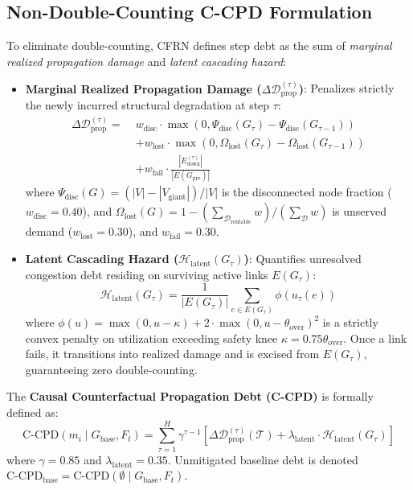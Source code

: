 \documentclass[pdflatex,sn-mathphys-num]{sn-jnl}
\theoremstyle{thmstyleone}
\theoremstyle{thmstyletwo}
\theoremstyle{thmstylethree}
\begin{document}
\subsection{Non-Double-Counting C-CPD Formulation}
To eliminate double-counting, CFRN defines step debt as the sum of \textit{marginal realized propagation damage} and \textit{latent cascading hazard}:
\begin{itemize}
    \item \textbf{Marginal Realized Propagation Damage ($\Delta \mathcal{D}_{\mathrm{prop}}^{(\tau)}$)}: Penalizes strictly the newly incurred structural degradation at step $\tau$:
    \begin{align}
    \Delta \mathcal{D}_{\mathrm{prop}}^{(\tau)} = \; & w_{\mathrm{disc}} \cdot \max(0, \Psi_{\mathrm{disc}}(G_\tau) - \Psi_{\mathrm{disc}}(G_{\tau-1})) \nonumber \\
    & + w_{\mathrm{lost}} \cdot \max(0, \Omega_{\mathrm{lost}}(G_\tau) - \Omega_{\mathrm{lost}}(G_{\tau-1})) \nonumber \\
    & + w_{\mathrm{fail}} \cdot \frac{|E_{\mathrm{down}}^{(\tau)}|}{|E(G_{\mathrm{pre}})|}
    \end{align}
    where $\Psi_{\mathrm{disc}}(G) = (|V| - |V_{\mathrm{giant}}|) / |V|$ is the disconnected node fraction ($w_{\mathrm{disc}} = 0.40$), and $\Omega_{\mathrm{lost}}(G) = 1 - (\sum_{\mathcal{D}_{\mathrm{routable}}} w) / (\sum_{\mathcal{D}} w)$ is unserved demand ($w_{\mathrm{lost}} = 0.30$), and $w_{\mathrm{fail}} = 0.30$.
    \item \textbf{Latent Cascading Hazard ($\mathcal{H}_{\mathrm{latent}}(G_\tau)$)}: Quantifies unresolved congestion debt residing on surviving active links $E(G_\tau)$:
    \begin{equation}
    \mathcal{H}_{\mathrm{latent}}(G_\tau) = \frac{1}{|E(G_\tau)|} \sum_{e \in E(G_\tau)} \phi(u_\tau(e))
    \end{equation}
    where $\phi(u) = \max(0, u - \kappa) + 2 \cdot \max(0, u - \theta_{\mathrm{over}})^2$ is a strictly convex penalty on utilization exceeding safety knee $\kappa = 0.75 \theta_{\mathrm{over}}$. Once a link fails, it transitions into realized damage and is excised from $E(G_\tau)$, guaranteeing zero double-counting.
\end{itemize}

The \textbf{Causal Counterfactual Propagation Debt (C-CPD)} is formally defined as:
\begin{equation}
\mathrm{C\text{-}CPD}(m_i \mid G_{\mathrm{base}}, F_t) = \sum_{\tau=1}^H \gamma^{\tau - 1} \left[ \Delta \mathcal{D}_{\mathrm{prop}}^{(\tau)}(\mathcal{T}) + \lambda_{\mathrm{latent}} \cdot \mathcal{H}_{\mathrm{latent}}(G_\tau) \right]
\end{equation}
where $\gamma = 0.85$ and $\lambda_{\mathrm{latent}} = 0.35$. Unmitigated baseline debt is denoted $\mathrm{C\text{-}CPD}_{\mathrm{base}} = \mathrm{C\text{-}CPD}(\emptyset \mid G_{\mathrm{base}}, F_t)$.
\end{document}
